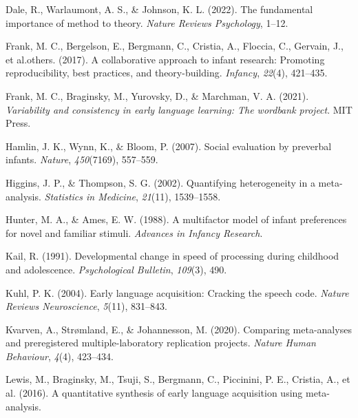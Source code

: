 \documentclass[10pt, letterpaper]{article}
\newenvironment{CSLReferences}%
  {}%
  {\par}
\begin{document}
\begin{CSLReferences}{1}{0}
\leavevmode{}%
Dale, R., Warlaumont, A. S., \& Johnson, K. L. (2022). The fundamental
importance of method to theory. \emph{Nature Reviews Psychology}, 1--12.

\leavevmode{}%
Frank, M. C., Bergelson, E., Bergmann, C., Cristia, A., Floccia, C.,
Gervain, J., et al.others. (2017). A collaborative approach to infant
research: Promoting reproducibility, best practices, and
theory-building. \emph{Infancy}, \emph{22}(4), 421--435.

\leavevmode{}%
Frank, M. C., Braginsky, M., Yurovsky, D., \& Marchman, V. A. (2021).
\emph{Variability and consistency in early language learning: The
wordbank project}. MIT Press.

\leavevmode{}%
Hamlin, J. K., Wynn, K., \& Bloom, P. (2007). Social evaluation by
preverbal infants. \emph{Nature}, \emph{450}(7169), 557--559.

\leavevmode{}%
Higgins, J. P., \& Thompson, S. G. (2002). Quantifying heterogeneity in
a meta-analysis. \emph{Statistics in Medicine}, \emph{21}(11),
1539--1558.

\leavevmode{}%
Hunter, M. A., \& Ames, E. W. (1988). A multifactor model of infant
preferences for novel and familiar stimuli. \emph{Advances in Infancy
Research}.

\leavevmode{}%
Kail, R. (1991). Developmental change in speed of processing during
childhood and adolescence. \emph{Psychological Bulletin}, \emph{109}(3),
490.

\leavevmode{}%
Kuhl, P. K. (2004). Early language acquisition: Cracking the speech
code. \emph{Nature Reviews Neuroscience}, \emph{5}(11), 831--843.

\leavevmode{}%
Kvarven, A., Strømland, E., \& Johannesson, M. (2020). Comparing
meta-analyses and preregistered multiple-laboratory replication
projects. \emph{Nature Human Behaviour}, \emph{4}(4), 423--434.

\leavevmode{}%
Lewis, M., Braginsky, M., Tsuji, S., Bergmann, C., Piccinini, P. E.,
Cristia, A., et al. (2016). A quantitative synthesis of early language
acquisition using meta-analysis.


\end{CSLReferences}
\end{document}
